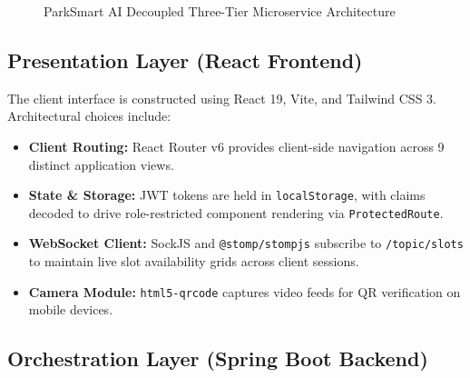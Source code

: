 \documentclass[conference,10pt]{IEEEtran}
\begin{document}
\begin{figure}[ht]
\caption{ParkSmart AI Decoupled Three-Tier Microservice Architecture}
\label{fig:arch}
\end{figure}

\subsection{Presentation Layer (React Frontend)}

The client interface is constructed using React 19, Vite, and Tailwind CSS 3. Architectural choices include:
\begin{itemize}[leftmargin=*]
    \item \textbf{Client Routing:} React Router v6 provides client-side navigation across 9 distinct application views.
    \item \textbf{State \& Storage:} JWT tokens are held in \texttt{localStorage}, with claims decoded to drive role-restricted component rendering via \texttt{ProtectedRoute}.
    \item \textbf{WebSocket Client:} SockJS and \texttt{@stomp/stompjs} subscribe to \texttt{/topic/slots} to maintain live slot availability grids across client sessions.
    \item \textbf{Camera Module:} \texttt{html5-qrcode} captures video feeds for QR verification on mobile devices.
\end{itemize}

\subsection{Orchestration Layer (Spring Boot Backend)}
\end{document}
